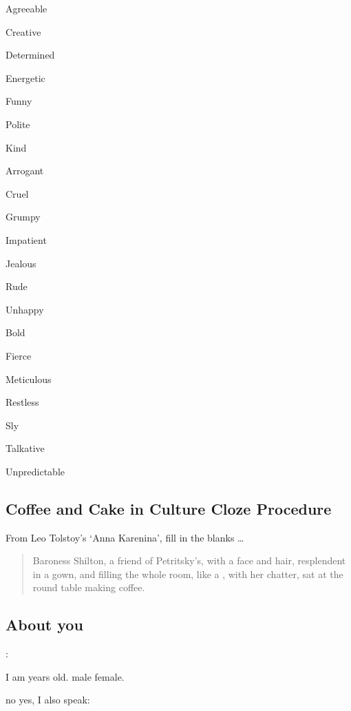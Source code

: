 \documentclass[a4paper,10pt]{article}
\begin{document}
\begin{multicols}{3}
    \begin{Qlist}
        \item Agreeable
        \item Creative
        \item Determined
        \item Energetic
        \item Funny
        \item Polite
        \item Kind
    \end{Qlist}
    \begin{Qlist}
        \item Arrogant
        \item Cruel
        \item Grumpy
        \item Impatient
        \item Jealous
        \item Rude
        \item Unhappy
    \end{Qlist}
    \begin{Qlist}
        \item Bold
        \item Fierce
        \item Meticulous
        \item Restless
        \item Sly
        \item Talkative
        \item Unpredictable
    \end{Qlist}
\end{multicols}

\subsection*{Coffee and Cake in Culture Cloze Procedure}

From Leo Tolstoy's `Anna Karenina', fill in the blanks \ldots

\begin{quote}
Baroness Shilton, a friend of Petritsky’s, with a \Qline{3cm} face and \Qline{3cm} hair, resplendent in a \Qline{3cm} gown, 
and filling the whole room, like a \Qline{3cm}, with her \Qline{3cm} chatter, sat at the round table making coffee.
\end{quote}

\subsection*{About you}

: \Qline{12cm}

 I am \Qline{2cm} years old. \hfil {} \QO{} male \QO{} female. 

 \hfil \QO{} no \hfil \QO{} yes, I also speak: \Qline{4cm}
\end{document}
